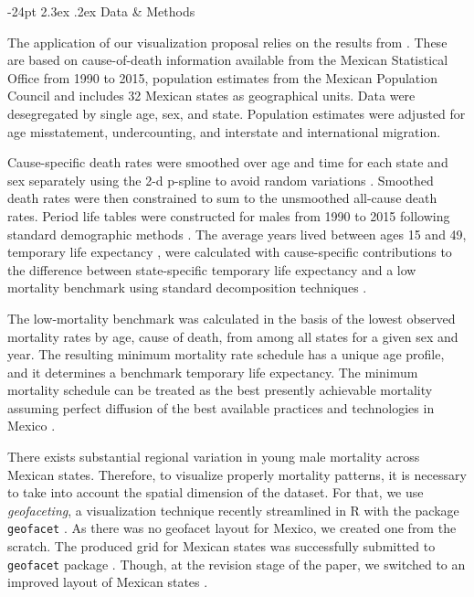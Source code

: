 \documentclass[10pt, twoside, parskip=half]{article}
\makeatletter
\renewcommand\section{\@startsection {section}{1}{\z@}%
                                   {-24pt}%
                                   {2.3ex \@plus.2ex}%
                                   {\normalfont\large\bfseries}}
\makeatother
\begin{document}
\hypertarget{data-methods}{%
\section{Data \& Methods}\label{data-methods}}

The application of our visualization proposal relies on the results from \citet{aburto2018bo}. These are based on cause-of-death information available from the Mexican Statistical Office from 1990 to 2015, population estimates from the Mexican Population Council \citep{INEGI} and includes 32 Mexican states as geographical units. Data were desegregated by single age, sex, and state. Population estimates were adjusted for age misstatement, undercounting, and interstate and international migration.

Cause-specific death rates were smoothed over age and time for each state and sex separately using the 2-d p-spline to avoid random variations \citep{camarda2012jss}. Smoothed death rates were then constrained to sum to the unsmoothed all-cause death rates. Period life tables were constructed for males from 1990 to 2015 following standard demographic methods \citep[Chapter 3]{preston2001}. The average years lived between ages 15 and 49, temporary life expectancy \citep{arriaga1984d}, were calculated with cause-specific contributions to the difference between state-specific temporary life expectancy and a low mortality benchmark using standard decomposition techniques \citep{horiuchi2008d}.

The low-mortality benchmark was calculated in the basis of the lowest observed mortality rates by age, cause of death, from among all states for a given sex and year. The resulting minimum mortality rate schedule has a unique age profile, and it determines a benchmark temporary life expectancy. The minimum mortality schedule can be treated as the best presently achievable mortality assuming perfect diffusion of the best available practices and technologies in Mexico \citep{vallin2008p, canudas-romo2019naaj}.

There exists substantial regional variation in young male mortality across Mexican states. Therefore, to visualize properly mortality patterns, it is necessary to take into account the spatial dimension of the dataset. For that, we use \emph{geofaceting}, a visualization technique recently streamlined in R with the package \texttt{geofacet} \citep{hafen2019}. As there was no geofacet layout for Mexico, we created one from the scratch. The produced grid for Mexican states was successfully submitted to \texttt{geofacet} package \citep{kashnitsky2017ga}. Though, at the revision stage of the paper, we switched to an improved layout of Mexican states \citep{zepeda2018g}.
\end{document}
